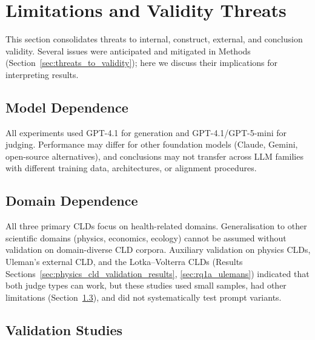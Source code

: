 \section{Limitations and Validity Threats}
\label{sec:discussion_limitations}

This section consolidates threats to internal, construct, external, and conclusion validity. Several issues were anticipated and mitigated in Methods (Section~\ref{sec:threats_to_validity}); here we discuss their implications for interpreting results.

\subsection{Model Dependence}

All experiments used GPT-4.1 for generation and GPT-4.1/GPT-5-mini for judging. Performance may differ for other foundation models (Claude, Gemini, open-source alternatives), and conclusions may not transfer across LLM families with different training data, architectures, or alignment procedures.

\subsection{Domain Dependence}

All three primary CLDs focus on health-related domains. Generalisation to other scientific domains (physics, economics, ecology) cannot be assumed without validation on domain-diverse CLD corpora. Auxiliary validation on physics CLDs, Uleman's external CLD, and the Lotka--Volterra CLDs (Results Sections~\ref{sec:physics_cld_validation_results}, \ref{sec:rq1a_ulemans}) indicated that both judge types can work, but these studies used small samples, had other limitations (Section~\ref{sec:validation_studies_limitations}), and did not systematically test prompt variants.

\subsection{Validation Studies}
\label{sec:validation_studies_limitations}

